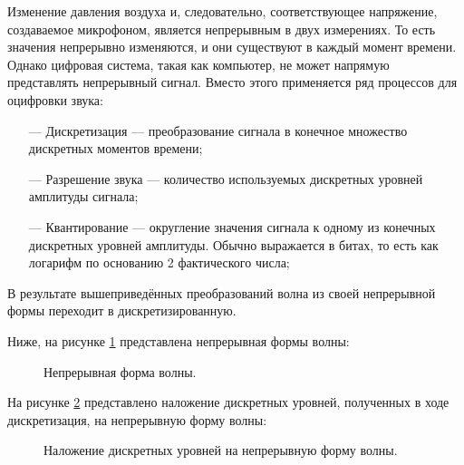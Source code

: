 	\par Изменение давления воздуха и, следовательно, соответствующее напряжение, создаваемое микрофоном, является непрерывным в двух измерениях.
	То есть значения непрерывно изменяются, и они существуют в каждый момент времени.
	Однако цифровая система, такая как компьютер, не может напрямую представлять непрерывный сигнал.
	Вместо этого применяется ряд процессов для оцифровки звука:
	\begin{itemize}
		\item[---] Дискретизация --- преобразование сигнала в конечное множество дискретных моментов времени;
		\item[---] Разрешение звука --- количество используемых дискретных уровней амплитуды сигнала;
		\item[---] Квантирование --- округление значения сигнала к одному из конечных дискретных уровней амплитуды. Обычно выражается в битах, то есть как логарифм по основанию 2 фактического числа;
	\end{itemize} 
	В результате вышеприведённых преобразований волна из своей непрерывной формы переходит в дискретизированную.
	
	Ниже, на рисунке \ref{fig:func} представлена непрерывная формы волны:

	\begin{figure}[!h]
		\caption{Непрерывная форма волны.}
		\label{fig:func}
	\end{figure}

	На рисунке \ref{fig:dfunc} представлено наложение дискретных уровней, полученных в ходе дискретизация, на непрерывную форму волны:

	\newpage
	\begin{figure}[!h]
		\caption{Наложение дискретных уровней на непрерывную форму волны.}
		\label{fig:dfunc}
	\end{figure}

